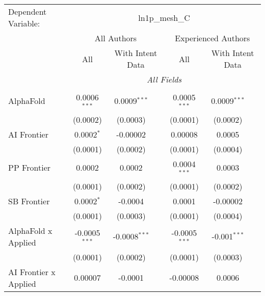 \begingroup
\centering
\begin{tabular}{lcccccc}
   \tabularnewline \midrule \midrule
   Dependent Variable: & \multicolumn{6}{c}{ln1p\_mesh\_C}\\
 & \multicolumn{3}{c}{All Authors} & \multicolumn{3}{c}{Experienced Authors} \\
\cmidrule(lr){2-4} \cmidrule(lr){5-7}
 & \multicolumn{1}{c}{All} & \multicolumn{2}{c}{With Intent Data} & \multicolumn{1}{c}{All} & \multicolumn{2}{c}{With Intent Data} \\
\cmidrule(lr){2-2} \cmidrule(lr){3-4} \cmidrule(lr){5-5} \cmidrule(lr){6-7}
 & \multicolumn{6}{c}{\textit{All Fields}} \\ \\
   AlphaFold                      & 0.0006$^{***}$  & 0.0009$^{***}$  &                 & 0.0005$^{***}$  & 0.0009$^{***}$ &   \\   
                                  & (0.0002)        & (0.0003)        &                 & (0.0001)        & (0.0002)       &   \\   
   AI Frontier                    & 0.0002$^{*}$    & -0.00002        &                 & 0.00008         & 0.0005         &   \\   
                                  & (0.0001)        & (0.0002)        &                 & (0.0001)        & (0.0004)       &   \\   
   PP Frontier                    & 0.0002          & 0.0002          &                 & 0.0004$^{***}$  & 0.0003         &   \\   
                                  & (0.0001)        & (0.0002)        &                 & (0.0001)        & (0.0002)       &   \\   
   SB Frontier                    & 0.0002$^{*}$    & -0.0004         &                 & 0.0001          & -0.00002       &   \\   
                                  & (0.0001)        & (0.0003)        &                 & (0.0001)        & (0.0004)       &   \\   
   AlphaFold x Applied            & -0.0005$^{***}$ & -0.0008$^{***}$ &                 & -0.0005$^{***}$ & -0.001$^{***}$ &   \\   
                                  & (0.0001)        & (0.0002)        &                 & (0.0001)        & (0.0003)       &   \\   
   AI Frontier x Applied          & 0.00007         & -0.0001         &                 & -0.00008        & 0.0006         &   \\   

\end{tabular}
